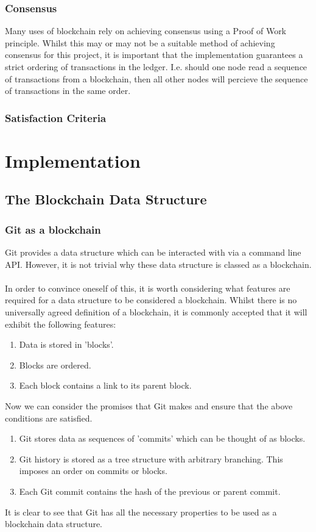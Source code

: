 \documentclass[12pt,a4paper,twoside,openright]{report}
\begin{document}
	\subsection*{Consensus}
	Many uses of blockchain rely on achieving consensus using a Proof of Work principle. 
	Whilst this may or may not be a suitable method of achieving consensus for this project, it is important that the implementation guarantees a strict ordering of transactions in the ledger.
	I.e. should one node read a sequence of transactions from a blockchain, then all other nodes will percieve the sequence of transactions in the same order.
	\subsection*{Satisfaction Criteria}
	\chapter{Implementation}
	\section{The Blockchain Data Structure}
	\subsection*{Git as a blockchain}
		Git provides a data structure which can be interacted with via a command line API. However, it is not trivial why these data structure is classed as a blockchain. \\
		\\
		In order to convince oneself of this, it is worth considering what features are required for a data structure to be considered a blockchain. 
		Whilst there is no universally agreed definition of a blockchain, it is commonly accepted that it will exhibit the following features:
		\begin{enumerate}
			\item Data is stored in 'blocks'.
			\item Blocks are ordered.
			\item Each block contains a link to its parent block.
		\end{enumerate}
		Now we can consider the promises that Git makes and ensure that the above conditions are satisfied.\\
		\begin{enumerate}
			\item Git stores data as sequences of 'commits' which can be thought of as blocks.
			\item Git history is stored as a tree structure with arbitrary branching. This imposes an order on commits or blocks.
			\item Each Git commit contains the hash of the previous or parent commit.
		\end{enumerate}
		It is clear to see that Git has all the necessary properties to be used as a blockchain data structure.
\end{document}
